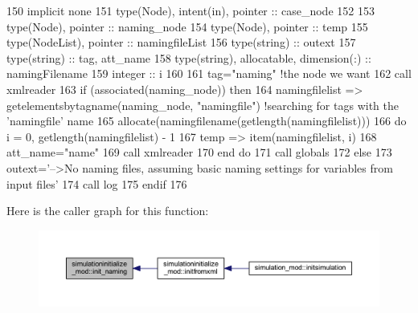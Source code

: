 \begin{DoxyCode}
150     \textcolor{keywordtype}{implicit none}
151     \textcolor{keywordtype}{type}(Node), \textcolor{keywordtype}{intent(in)}, \textcolor{keywordtype}{pointer} :: case\_node
152 
153     \textcolor{keywordtype}{type}(Node), \textcolor{keywordtype}{pointer} :: naming\_node
154     \textcolor{keywordtype}{type}(Node), \textcolor{keywordtype}{pointer} :: temp
155     \textcolor{keywordtype}{type}(NodeList), \textcolor{keywordtype}{pointer} :: namingfileList
156     \textcolor{keywordtype}{type}(string) :: outext
157     \textcolor{keywordtype}{type}(string) :: tag, att\_name
158     \textcolor{keywordtype}{type}(string), \textcolor{keywordtype}{allocatable}, \textcolor{keywordtype}{dimension(:)} :: namingFilename
159     \textcolor{keywordtype}{integer} :: i
160 
161     tag=\textcolor{stringliteral}{"naming"}    \textcolor{comment}{!the node we want}
162     \textcolor{keyword}{call }xmlreader%
163     \textcolor{keywordflow}{if} (\textcolor{keyword}{associated}(naming\_node)) \textcolor{keywordflow}{then}
164         namingfilelist => getelementsbytagname(naming\_node, \textcolor{stringliteral}{"namingfile"})       \textcolor{comment}{!searching for tags with
       the 'namingfile' name}
165         \textcolor{keyword}{allocate}(namingfilename(getlength(namingfilelist)))
166         \textcolor{keywordflow}{do} i = 0, getlength(namingfilelist) - 1
167             temp => item(namingfilelist, i)
168             att\_name=\textcolor{stringliteral}{"name"}
169             \textcolor{keyword}{call }xmlreader%
170 \textcolor{keywordflow}{        end do}
171         \textcolor{keyword}{call }globals%
172     \textcolor{keywordflow}{else}
173         outext=\textcolor{stringliteral}{'-->No naming files, assuming basic naming settings for variables from input files'}
174         \textcolor{keyword}{call }log%
175 \textcolor{keywordflow}{    endif}
176 
\end{DoxyCode}
Here is the caller graph for this function\+:\nopagebreak
\begin{figure}[H]
\begin{center}
\leavevmode
\includegraphics[width=350pt]{namespacesimulationinitialize__mod_a4909cc4cb57549e6eed3f69d6dfa30b5_icgraph}
\end{center}
\end{figure}
\mbox{\label{namespacesimulationinitialize__mod_a0b32e8c950fc615198d1e47ba1d36cd6}} 
